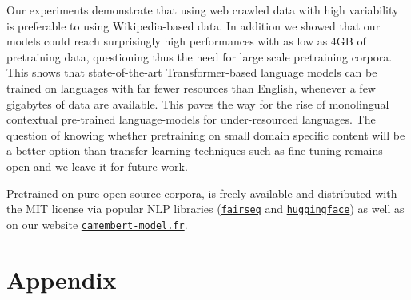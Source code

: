 Our experiments demonstrate that using web crawled
data with high variability is preferable to using Wikipedia-based data.  In addition we
showed that our models could reach surprisingly high performances with
as low as 4GB of pretraining data, questioning thus the need for large
scale pretraining corpora.  This shows that state-of-the-art
Transformer-based language models can be trained on languages with far
fewer resources than English, whenever a few gigabytes of data are
available. This paves the way for the rise of monolingual contextual
pre-trained language-models for under-resourced languages.  The
question of knowing whether pretraining on small domain specific
content will be a better option than transfer learning techniques such
as fine-tuning remains open and we leave it for future work.


Pretrained on pure open-source corpora, \camembert is freely available and distributed with the MIT license via popular NLP libraries (\href{https://github.com/pytorch/fairseq}{\texttt{fairseq}} and \href{https://github.com/huggingface/transformers}{\texttt{huggingface}}) as well as on our website \href{https://camembert-model.fr}{\texttt{camembert-model.fr}}.



\section*{Appendix}


